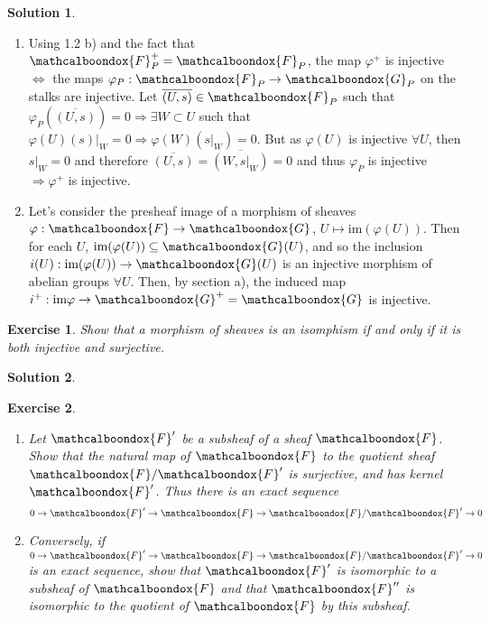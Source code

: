 \documentclass[12pt]{article}
\newcommand{\imp}{\ensuremath{\Rightarrow}}
\newcommand{\ima}{\ensuremath{\text{im}}}
\newtheorem{ex}{Exercise}[section]
\theoremstyle{definition}
\newtheorem*{sol}{Solution}
\newcommand{\sF}{\ensuremath{\mathcalboondox{F}}}
\newcommand{\sG}{\ensuremath{\mathcalboondox{G}}}
\begin{document}
\begin{sol}
	\begin{enumerate}[label=\alph*)]
		\item Using 1.2 b) and the fact that $\sF^{+}_P = \sF_P$, the map $\varphi^{+}$ is injective $\iff$ the maps $\varphi_P: \sF_P \to \sG_P$ on the stalks are injective. Let $\overline{(U,s)} \in \sF_P$ such that $\varphi_P(\overline{(U,s)}) = 0 \imp \exists W \subset U$ such that $\varphi(U)(s)|_W = 0 \imp \varphi(W)(s|_W) = 0$. But as $\varphi(U)$ is injective $\forall U$, then $s|_W = 0$ and therefore $\overline{(U,s)} = \overline{(W,s|_W)} = 0$ and thus $\varphi_P$ is injective $\imp \varphi^{+}$ is injective.

		\item Let's consider the presheaf image of a morphism of sheaves $\varphi: \sF \to \sG$, $U \mapsto \ima (\varphi(U))$. Then for each $U$, $\ima (\varphi(U)) \subseteq \sG(U)$, and so the inclusion $i(U): \ima (\varphi(U)) \to \sG(U)$ is an injective morphism of abelian groups $\forall U$. Then, by section a), the induced map $i^{+}: \ima \varphi \to \sG^{+} = \sG$ is injective. 
	\end{enumerate}
\end{sol}

\begin{ex}
	Show that a morphism of sheaves is an isomphism if and only if it is both injective and surjective.
\end{ex}

\begin{sol}

\end{sol}

\begin{ex}
	\begin{enumerate}[label=\alph*)]
		\item Let $\sF'$ be a subsheaf of a sheaf $\sF$. Show that the natural map of $\sF$ to the quotient sheaf $\sF / \sF'$ is surjective, and has kernel $\sF'$. Thus there is an exact sequence
		\[
			0 \to \sF' \to \sF \to \sF / \sF' \to 0
		\]

		\item Conversely, if $0 \to \sF' \to \sF \to \sF / \sF' \to 0$ is an exact sequence, show that $\sF'$ is isomorphic to a subsheaf of $\sF$ and that $\sF''$ is isomorphic to the quotient of $\sF$ by this subsheaf.
	\end{enumerate}
\end{ex}
\end{document}
